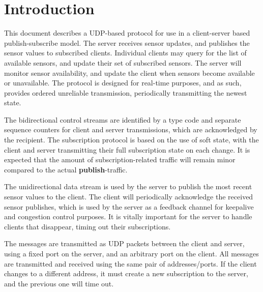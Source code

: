 \documentclass[a4paper]{article}
\begin{document}


\tableofcontents
\newpage

\section{Introduction}
This document describes a UDP-based protocol for use in a client-server based publish-subscribe model.
The server receives sensor updates, and publishes the sensor values to subscribed clients.
Individual clients may query for the list of available sensors, and update their set of subscribed sensors.
The server will monitor sensor availability, and update the client when sensors become available or unavailable.
The protocol is designed for real-time purposes, and as such, provides ordered unreliable transmission, periodically transmitting the newest state.

The bidirectional control streams are identified by a type code and separate sequence counters for client and server transmissions, which are acknowledged by the recipient.
The subscription protocol is based on the use of soft state, with the client and server transmitting their full subscription state on each change.
It is expected that the amount of subscription-related traffic will remain minor compared to the actual \textbf{publish}-traffic.

The unidirectional data stream is used by the server to publish the most recent sensor values to the client.
The client will periodically acknowledge the received sensor publishes, which is used by the server as a feedback channel for keepalive and congestion control purposes.
It is vitally important for the server to handle clients that disappear, timing out their subscriptions.

The messages are transmitted as UDP packets between the client and server, using a fixed port on the server, and an arbitrary port on the client.
All messages are transmitted and received using the same pair of \- addresses/ports.
If the client changes to a different address, it must create a new subscription to the server, and the previous one will time out.
\end{document}
